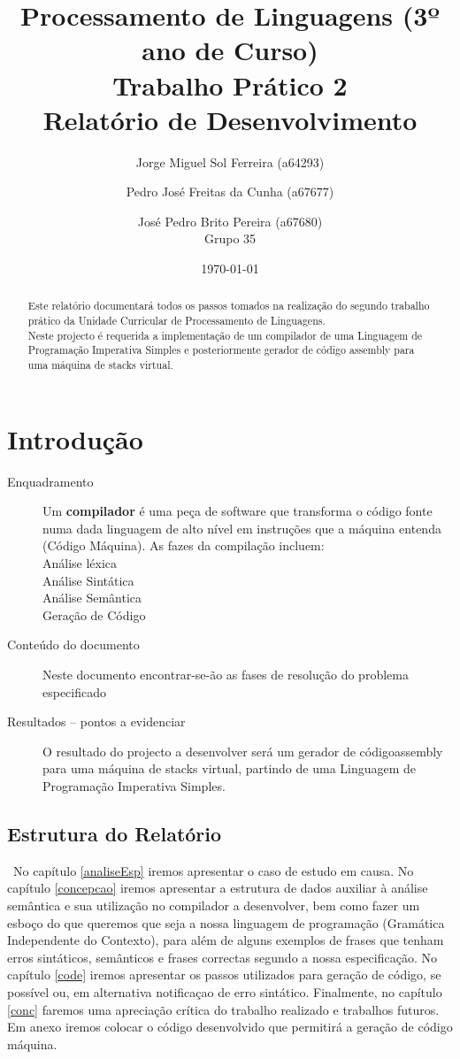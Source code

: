 \documentclass{report}
\title{Processamento de Linguagens (3º ano de Curso)\\ \textbf{Trabalho Prático 2}\\ Relatório de Desenvolvimento}
\author{Jorge Miguel Sol Ferreira (a64293) \and Pedro José Freitas da Cunha (a67677) \and José Pedro Brito Pereira (a67680)\\Grupo 35 }
\date{\today}
\begin{document}
\maketitle

\begin{abstract}
Este relatório documentará todos os passos tomados na realização do segundo trabalho prático da Unidade Curricular de Processamento de Linguagens.\\ Neste projecto é requerida a implementação de um compilador de uma Linguagem de Programação Imperativa Simples e posteriormente gerador de código assembly para uma máquina de stacks virtual.
\end {abstract}
\tableofcontents

\chapter{Introdução} \label{intro}

\begin{description}
  \item [Enquadramento] Um \textbf{compilador} é uma peça de software que transforma o código fonte numa dada linguagem de alto nível em instruções que a máquina entenda (Código Máquina). As fazes da compilação incluem:\\Análise léxica\\Análise Sintática\\Análise Semântica\\Geração de Código
  \item [Conteúdo do documento] Neste documento encontrar-se-ão as fases de resolução do problema especificado
  \item [Resultados -- pontos a evidenciar] O resultado do projecto a desenvolver será um gerador de códigoassembly para uma máquina de stacks virtual, partindo de uma Linguagem de Programação Imperativa Simples.
\end{description}



\section*{Estrutura do Relatório} \
No capítulo \ref{analiseEsp} iremos apresentar o caso de estudo em causa. No capítulo \ref{concepcao} iremos apresentar a estrutura de dados auxiliar à análise semântica e sua utilização no compilador a desenvolver, bem como fazer um esboço do que queremos que seja a nossa linguagem de programação (Gramática Independente do Contexto), para além de alguns exemplos de frases que tenham erros sintáticos, semânticos e frases correctas segundo a nossa especificação. No capítulo \ref{code} iremos apresentar os passos utilizados para geração de código, se possível ou, em alternativa notificaçao de erro sintático. Finalmente, no capítulo \ref{conc} faremos uma apreciação crítica do trabalho realizado e trabalhos futuros. Em anexo iremos colocar o código desenvolvido que permitirá a geração de código máquina.
\end{document}
